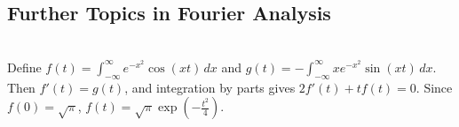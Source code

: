 \subsection{Further Topics in Fourier Analysis}

\begin{example} \label{ex:gaussian-fourier-integral-differentiation} \\
Define $f(t)=\int_{-\infty}^{\infty}e^{-x^2}\cos(xt)\,dx$ and $g(t)=-\int_{-\infty}^{\infty}xe^{-x^2}\sin(xt)\,dx$.\\
Then $f'(t)=g(t)$, and integration by parts gives $2f'(t)+tf(t)=0$. Since $f(0)=\sqrt{\pi}$, $f(t)=\sqrt{\pi}\exp\!\left(-\frac{t^2}{4}\right)$.
\end{example}
